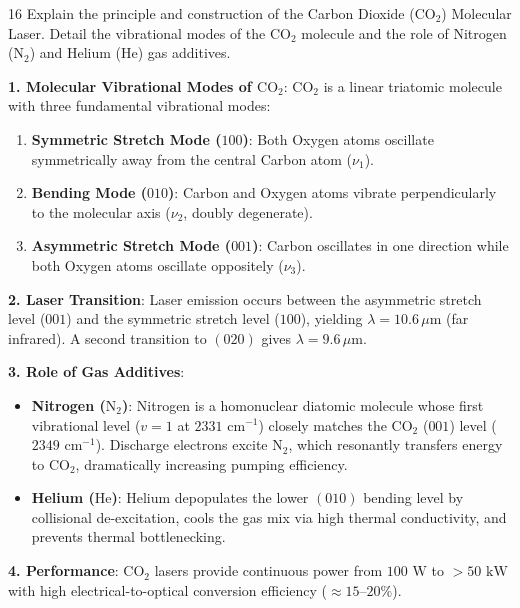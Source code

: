 \begin{theoryq}{16}
Explain the principle and construction of the Carbon Dioxide ($\text{CO}_2$) Molecular Laser. Detail the vibrational modes of the $\text{CO}_2$ molecule and the role of Nitrogen ($\text{N}_2$) and Helium ($\text{He}$) gas additives.
\end{theoryq}
\begin{theorysol}
\textbf{1. Molecular Vibrational Modes of $\text{CO}_2$}:
$\text{CO}_2$ is a linear triatomic molecule with three fundamental vibrational modes:
\begin{enumerate}
    \item \textbf{Symmetric Stretch Mode ($100$)}: Both Oxygen atoms oscillate symmetrically away from the central Carbon atom ($\nu_1$).
    \item \textbf{Bending Mode ($010$)}: Carbon and Oxygen atoms vibrate perpendicularly to the molecular axis ($\nu_2$, doubly degenerate).
    \item \textbf{Asymmetric Stretch Mode ($001$)}: Carbon oscillates in one direction while both Oxygen atoms oscillate oppositely ($\nu_3$).
\end{enumerate}

\textbf{2. Laser Transition}:
Laser emission occurs between the asymmetric stretch level ($001$) and the symmetric stretch level ($100$), yielding \textbf{$\lambda = 10.6\,\mu\text{m}$} (far infrared). A second transition to $(020)$ gives $\lambda = 9.6\,\mu\text{m}$.

\textbf{3. Role of Gas Additives}:
\begin{itemize}
    \item \textbf{Nitrogen ($\text{N}_2$)}: Nitrogen is a homonuclear diatomic molecule whose first vibrational level ($v=1$ at $2331\text{ cm}^{-1}$) closely matches the $\text{CO}_2$ ($001$) level ($2349\text{ cm}^{-1}$). Discharge electrons excite $\text{N}_2$, which resonantly transfers energy to $\text{CO}_2$, dramatically increasing pumping efficiency.
    \item \textbf{Helium ($\text{He}$)}: Helium depopulates the lower $(010)$ bending level by collisional de-excitation, cools the gas mix via high thermal conductivity, and prevents thermal bottlenecking.
\end{itemize}

\textbf{4. Performance}:
$\text{CO}_2$ lasers provide continuous power from $100\text{ W}$ to $> 50\text{ kW}$ with high electrical-to-optical conversion efficiency ($\approx 15\text{--}20\%$).
\end{theorysol}
\vspace{4mm}

